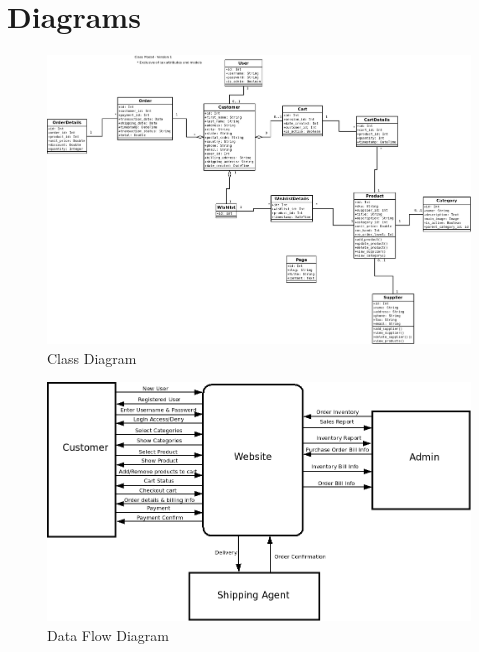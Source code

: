 \documentclass{report}
\begin{document}
\chapter{Diagrams}  %
\begin{figure}[h!]
\includegraphics[width=\linewidth]{Diagrams/ClassDiagram.png}
\caption{Class Diagram}
\label{fig:ClassDiagram}
\end{figure}

\begin{figure}[h!]
\includegraphics[width=\linewidth]{Diagrams/DataFlowDiagram.png}
\caption{Data Flow Diagram}
\label{fig:DataFlow}
\end{figure}
\end{document}
